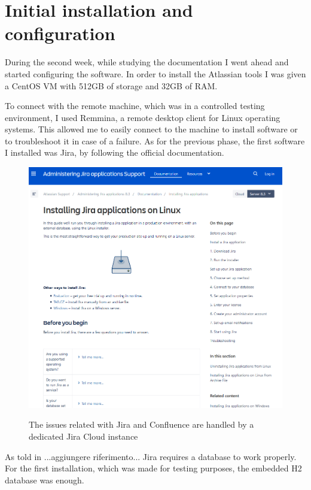 \section{Initial installation and configuration}
	
	During the second week, while studying the documentation I went ahead and started configuring the software.
	In order to install the Atlassian tools I was given a CentOS VM with 512GB of storage and 32GB of RAM.
		
	
	To connect with the remote machine, which was in a controlled testing environment, I used Remmina, a remote desktop client for Linux operating systems.
	This allowed me to easily connect to the machine to install software or to troubleshoot it in case of a failure.
	As for the previous phase, the first software I installed was Jira, by following the official documentation.
	\begin{figure}[H]
		\centering
		\includegraphics[width=1\textwidth]{resources/jira_installation}\\
		\caption{The issues related with Jira and Confluence are handled by a dedicated Jira Cloud instance}
	\end{figure}
	
	As told in ...aggiungere riferimento... Jira requires a database to work properly.
	For the first installation, which was made for testing purposes, the embedded H2 database was enough.
	
